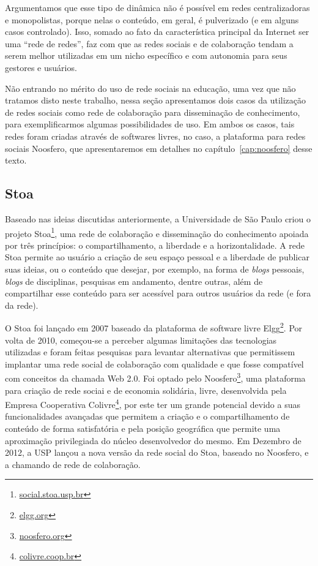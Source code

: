 Argumentamos que esse tipo de dinâmica não é possível em redes centralizadoras e monopolistas,
porque nelas o conteúdo, em geral, é pulverizado (e em alguns casos controlado).
Isso, somado ao fato da característica principal da Internet ser uma ``rede de redes'',
faz com que as redes sociais e de colaboração tendam a serem melhor utilizadas
em um nicho específico e com autonomia para seus gestores e usuários.

Não entrando no mérito do uso de rede sociais na educação, uma vez que não tratamos disto neste trabalho,
nessa seção apresentamos dois casos da utilização de redes sociais como rede de
colaboração para disseminação de conhecimento, para exemplificarmos algumas possibilidades de uso.
%
Em ambos os casos, tais redes foram criadas através de softwares livres, no caso, a  plataforma para 
redes sociais Noosfero, que apresentaremos em detalhes no capítulo~\ref{cap:noosfero} desse texto.

\subsection{Stoa}

Baseado nas ideias discutidas anteriormente, a Universidade de São Paulo criou o
projeto Stoa\footnote{\url{social.stoa.usp.br}}, uma rede de colaboração e
disseminação do conhecimento apoiada por três princípios: o compartilhamento, a
liberdade e a horizontalidade.
%
A rede Stoa permite ao usuário a criação de seu espaço pessoal e a liberdade de
publicar suas ideias, ou o conteúdo que desejar, por exemplo, na forma de
\textit{blogs} pessoais, \textit{blogs} de disciplinas, pesquisas em andamento,
dentre outras, além de compartilhar esse conteúdo para ser acessível
para outros usuários da rede (e fora da rede).

O Stoa foi lançado em 2007 baseado da plataforma de software livre
Elgg\footnote{\url{elgg.org}}.
%
Por volta de 2010, começou-se a perceber algumas limitações das tecnologias
utilizadas e foram feitas pesquisas para levantar alternativas que permitissem
implantar uma rede social de colaboração com qualidade e que fosse compatível
com conceitos da chamada Web 2.0.
%
Foi optado pelo Noosfero\footnote{\url{noosfero.org}}, uma plataforma para
criação de rede sociai e de economia solidária, livre, desenvolvida pela
Empresa Cooperativa Colivre\footnote{\url{colivre.coop.br}}, por este ter um
grande potencial devido a suas funcionalidades avançadas que permitem a criação
e o compartilhamento de conteúdo de forma satisfatória e pela posição geográfica
que permite uma aproximação privilegiada do núcleo desenvolvedor do mesmo.
%
Em Dezembro de 2012, a USP lançou a nova versão da rede social do Stoa, baseado
no Noosfero, e a chamando de rede de colaboração.

